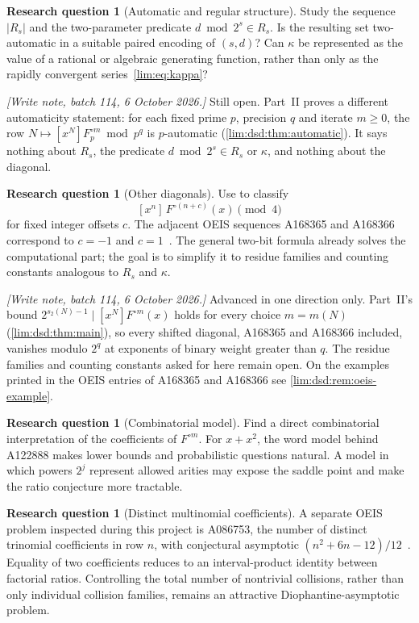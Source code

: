 \documentclass[11pt]{article}
\theoremstyle{definition}
\newtheorem{question}[theorem]{Research question}
\theoremstyle{remark}
\newcommand{\coef}[2]{[x^{#1}]\,#2}
\begin{document}
\begin{question}[Automatic and regular structure]
\label{lim:q:automatic}
Study the sequence $|R_s|$ and the two-parameter predicate
$d\bmod2^s\in R_s$.  Is the resulting set two-automatic in a suitable paired
encoding of $(s,d)$?  Can $\kappa$ be represented as the value of a rational
or algebraic generating function, rather than only as the rapidly convergent
series~\eqref{lim:eq:kappa}?
\end{question}

\emph{[Write note, batch 114, 6 October 2026.]} Still open. Part~II proves a different automaticity
statement: for each fixed prime $p$, precision $q$ and iterate $m\ge0$, the
row $N\mapsto[x^N]F_p^{\circ m}\bmod p^q$ is $p$-automatic
(\cref{lim:dsd:thm:automatic}). It says nothing about $R_s$, the predicate
$d\bmod2^s\in R_s$ or $\kappa$, and nothing about the diagonal.

\begin{question}[Other diagonals]
\label{lim:q:other-diagonals}
Use  to classify
\[
  \coef{n}{F^{\circ(n+c)}(x)}\pmod4
\]
for fixed integer offsets $c$.  The adjacent OEIS sequences A168365 and
A168366 correspond to $c=-1$ and $c=1$~\cite{OEIS-A168365,OEIS-A168366}.
The general two-bit formula already solves the computational part; the goal is
to simplify it to residue families and counting constants analogous to
$R_s$ and $\kappa$.
\end{question}

\emph{[Write note, batch 114, 6 October 2026.]} Advanced in one direction only. Part~II's bound
$2^{s_2(N)-1}\mid[x^N]F^{\circ m}(x)$ holds for every choice $m=m(N)$
(\cref{lim:dsd:thm:main}), so every shifted diagonal, A168365 and A168366
included, vanishes modulo $2^q$ at exponents of binary weight greater than
$q$. The residue families and counting constants asked for here remain
open. On the examples printed in the OEIS entries of A168365 and A168366
see \cref{lim:dsd:rem:oeis-example}.

\begin{question}[Combinatorial model]
Find a direct combinatorial interpretation of the coefficients of
$F^{\circ m}$.  For $x+x^2$, the word model behind A122888 makes lower bounds
and probabilistic questions natural.  A model in which powers $2^j$ represent
allowed arities may expose the saddle point and make the ratio conjecture more
tractable.
\end{question}

\begin{question}[Distinct multinomial coefficients]
A separate OEIS problem inspected during this project is A086753, the number
of distinct trinomial coefficients in row $n$, with conjectural asymptotic
$(n^2+6n-12)/12$~\cite{OEIS-A086753}.  Equality of two coefficients reduces to
an interval-product identity between factorial ratios.  Controlling the total
number of nontrivial collisions, rather than only individual collision
families, remains an attractive Diophantine-asymptotic problem.
\end{question}
\end{document}

